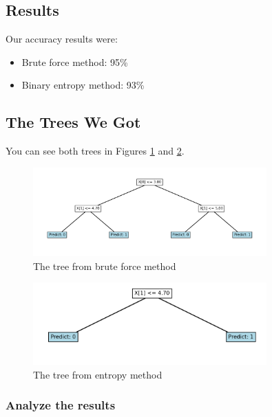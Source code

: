 \documentclass{article}
\begin{document}
\subsection{Results}

Our accuracy results were:
\begin{itemize}
    \item Brute force method: 95\%
    \item Binary entropy method: 93\%
\end{itemize}

\subsection{The Trees We Got}

You can see both trees in Figures \ref{fig:brute_force_tree} and \ref{fig:entropy_tree}.

\begin{figure}[H]
    \centering
    \includegraphics[width=0.8\textwidth]{assets/brute_force_tree.png}
    \caption{The tree from brute force method}
    \label{fig:brute_force_tree}
\end{figure}

\begin{figure}[H]
    \centering
    \includegraphics[width=0.8\textwidth]{assets/entropy_tree.png}
    \caption{The tree from entropy method}
    \label{fig:entropy_tree}
\end{figure}

\subsubsection{Analyze the results}
\end{document}
